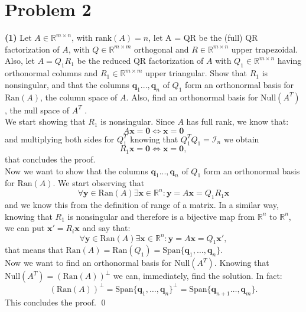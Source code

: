 \documentclass[a4paper,11pt]{article}
\newcommand{\R}{\mathbb{R}}
\begin{document}
\section*{Problem 2}
\textbf{(1)} Let $A \in \R^{m\times n}$, with $\text{rank}(A) = n$, let {A = QR} be the (full) QR factorization of $A$, with $Q \in \R^{m\times m} $ orthogonal and $R \in \R^{m\times n}$ upper trapezoidal. Also, let $A = Q_1 R_1$ be the reduced QR factorization of $A$ with $Q_1 \in \R^{m\times n}$ having orthonormal columns and $R_1 \in \R^{m\times m}$ upper triangular. Show that $R_1$ is nonsingular, and that the columns $\textbf{q}_1 . . . , \textbf{q}_n$ of $Q_1$ form an orthonormal basis for $\text{Ran}(A)$, the column space of $A$. Also, find an orthonormal basis for $\text{Null}(A^T)$, the null space of $A^T$ .\\
We start showing that $R_1$ is nonsingular. Since $A$ has full rank, we know that:
\begin{equation}\label{key}
	A \textbf{x} = \textbf{0} \Leftrightarrow \textbf{x} = \textbf{0}
\end{equation}
and multiplying both sides for $Q_1^T$ knowing that $Q_1^T Q_1 = \mathcal{I}_n$ we obtain
\begin{equation}\label{key}
	R_1 \textbf{x} = \textbf{0} \Leftrightarrow \textbf{x} = \textbf{0},
\end{equation}
that concludes the proof.\\
Now we want to show that the columns $\textbf{q}_1 . . . , \textbf{q}_n$ of $Q_1$ form an orthonormal basis for $\text{Ran}(A)$. We start observing that 
\begin{equation}\label{key}
	\forall \textbf{y} \in \text{Ran}(A) \exists \textbf{x} \in \R^n : \textbf{y} = A \textbf{x} = Q_1R_1\textbf{x}
\end{equation}
and we know this from the definition of range of a matrix. In a similar way, knowing that $R_1$ is nonsingular and therefore is a bijective map from $\R^n$ to $\R^n$, we can put $\textbf{x}' = R_i \textbf{x}$ and say that:
\begin{equation}\label{key}
	\forall \textbf{y} \in \text{Ran}(A) \exists \textbf{x} \in \R^n : \textbf{y} = A \textbf{x} = Q_1\textbf{x}',
\end{equation}
that means that $\text{Ran}(A) = \text{Ran}(Q_1) = \text{Span}\{\textbf{q}_1,\dots,\textbf{q}_n\}$.\\
Now we want to find an orthonormal basis for $\text{Null}(A^T)$. Knowing that $\text{Null}(A^T) = (\text{Ran}(A))^\perp$ we can, immediately, find the solution. In fact:
\begin{equation}\label{key}
	(\text{Ran}(A))^\perp = \text{Span}\{\textbf{q}_1,\dots,\textbf{q}_n\}^\perp = \text{Span}\{\textbf{q}_{n+1}\dots,\textbf{q}_m\}.
\end{equation}
This concludes the proof. \qed\\
\end{document}
